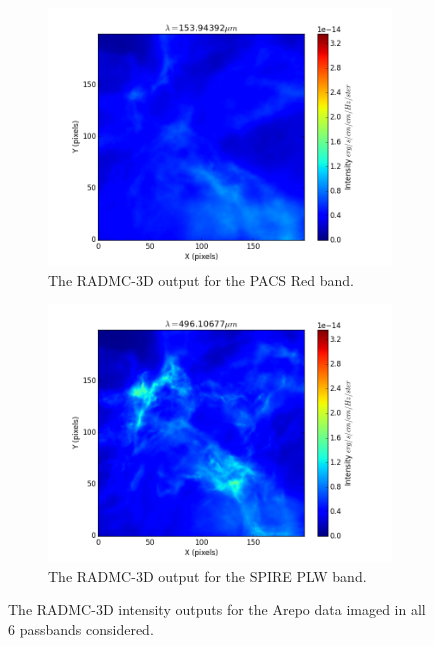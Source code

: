 \documentclass{report}
\begin{document}
\begin{figure}
\begin{subfigure}[b]{.45\linewidth}
\includegraphics[width=\linewidth]{../img/sph/red.png}
\caption{The RADMC-3D output for the PACS Red band.}\label{fig:sphred}
\end{subfigure}
\begin{subfigure}[b]{.45\linewidth}
\includegraphics[width=\linewidth]{../img/sph/plw.png}
\caption{The RADMC-3D output for the SPIRE PLW band.}\label{fig:sphplw}
\end{subfigure}
\caption{The RADMC-3D intensity outputs for the Arepo data imaged in all 6 passbands considered.} \label{fig:sph-output}
\end{figure}


\printbibliography


\end{document}
